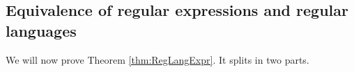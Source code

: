 

\setcounter{section}{2}
\setcounter{subsection}{2}
\setcounter{dfn}{6}

\subsection{Equivalence of regular expressions and regular languages}
We will now prove Theorem \ref{thm:RegLangExpr}.
It splits in two parts.


